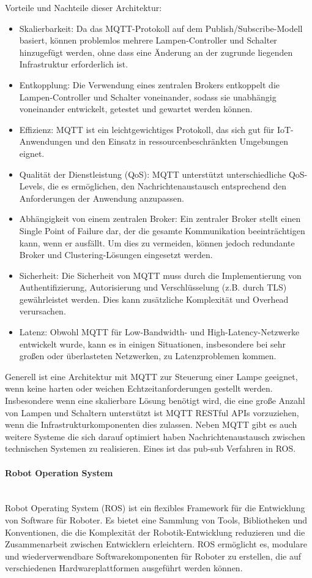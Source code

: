 Vorteile und Nachteile dieser Architektur: 
\begin{itemize}
\item Skalierbarkeit: Da das MQTT-Protokoll auf dem Publish/Subscribe-Modell basiert, können problemlos mehrere Lampen-Controller und Schalter hinzugefügt werden, ohne dass eine Änderung an der zugrunde liegenden Infrastruktur erforderlich ist.
\item Entkopplung: Die Verwendung eines zentralen Brokers entkoppelt die Lampen-Controller und Schalter voneinander, sodass sie unabhängig voneinander entwickelt, getestet und gewartet werden können.
\item Effizienz: MQTT ist ein leichtgewichtiges Protokoll, das sich gut für IoT-Anwendungen und den Einsatz in ressourcenbeschränkten Umgebungen eignet.
\item Qualität der Dienstleistung (QoS): MQTT unterstützt unterschiedliche QoS-Levels, die es ermöglichen, den Nachrichtenaustausch entsprechend den Anforderungen der Anwendung anzupassen.
\item Abhängigkeit von einem zentralen Broker: Ein zentraler Broker stellt einen Single Point of Failure dar, der die gesamte Kommunikation beeinträchtigen kann, wenn er ausfällt. Um dies zu vermeiden, können jedoch redundante Broker und Clustering-Lösungen eingesetzt werden.
\item Sicherheit: Die Sicherheit von MQTT muss durch die Implementierung von Authentifizierung, Autorisierung und Verschlüsselung (z.B. durch TLS) gewährleistet werden. Dies kann zusätzliche Komplexität und Overhead verursachen.
\item Latenz: Obwohl MQTT für Low-Bandwidth- und High-Latency-Netzwerke entwickelt wurde, kann es in einigen Situationen, insbesondere bei sehr großen oder überlasteten Netzwerken, zu Latenzproblemen kommen.
\end{itemize}

Generell ist eine Architektur mit MQTT zur Steuerung einer Lampe geeignet, wenn keine harten oder weichen Echtzeitanforderungen gestellt werden. Insbesondere wenn eine skalierbare Lösung benötigt wird, die eine große Anzahl von Lampen und Schaltern unterstützt ist MQTT RESTful APIs vorzuziehen, wenn die Infrastrukturkomponenten dies zulassen. 
Neben MQTT gibt es auch weitere Systeme die sich darauf optimiert haben Nachrichtenaustausch zwischen technischen Systemen zu realisieren. Eines ist das pub-sub Verfahren in ROS. 
\paragraph{Robot Operation System\\\\}
Robot Operating System (ROS) ist ein flexibles Framework für die Entwicklung von Software für Roboter. Es bietet eine Sammlung von Tools, Bibliotheken und Konventionen, die die Komplexität der Robotik-Entwicklung reduzieren und die Zusammenarbeit zwischen Entwicklern erleichtern. ROS ermöglicht es, modulare und wiederverwendbare Softwarekomponenten für Roboter zu erstellen, die auf verschiedenen Hardwareplattformen ausgeführt werden können.


